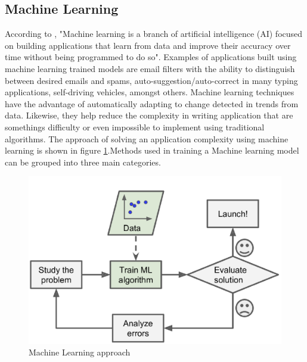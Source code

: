 \documentclass[conference]{IEEEtran}
\begin{document}
\subsection{Machine Learning}
According to \cite{ibm_cloud_education_2020}, "Machine learning is a branch of artificial intelligence (AI) focused on building applications that learn from data and improve their accuracy over time without being programmed to do so". Examples of applications built using machine learning trained models are email filters with the ability to distinguish between desired emails and spams, auto-suggestion/auto-correct in many typing applications, self-driving vehicles, amongst others. Machine learning techniques have the advantage of automatically adapting to change detected in trends from data. Likewise, they help reduce the complexity in writing application that are somethings difficulty or even impossible to implement using traditional algorithms. The approach of solving an application complexity using machine learning is shown in figure \ref{fig:machine_approach}.Methods used in training a Machine learning model can be grouped into three main categories.


\begin{figure}[htbp]
	\centerline{\includegraphics [scale=0.32]{figures/machine_approach.png}}
	\caption{Machine Learning approach}
	\label{fig:machine_approach}
\end{figure}
\end{document}
